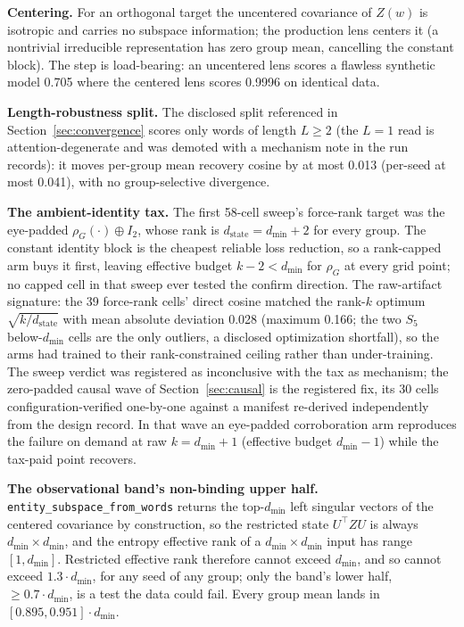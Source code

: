 \documentclass{article}
\newcommand{\dmin}{d_{\min}}
\newcommand{\dstate}{d_{\mathrm{state}}}
\begin{document}
\textbf{Centering.} For an orthogonal target the uncentered covariance
of $Z(w)$ is isotropic and carries no subspace information; the
production lens centers it (a nontrivial irreducible representation has
zero group mean, cancelling the constant block). The step is
load-bearing: an uncentered lens scores a flawless synthetic model 0.705
where the centered lens scores 0.9996 on identical data.

\textbf{Length-robustness split.} The disclosed split referenced in
Section~\ref{sec:convergence} scores only words of length $L \geq 2$
(the $L = 1$ read is attention-degenerate and was demoted with a
mechanism note in the run records): it moves per-group mean recovery
cosine by at most 0.013 (per-seed at most 0.041), with no
group-selective divergence.

\textbf{The ambient-identity tax.} The first 58-cell sweep's force-rank
target was the eye-padded $\rho_G(\cdot) \oplus I_2$, whose rank is
$\dstate = \dmin + 2$ for every group.
The constant identity block is
the cheapest reliable loss reduction, so a rank-capped arm buys it
first, leaving effective budget $k - 2 < \dmin$ for $\rho_G$ at every
grid point; no capped cell in that sweep ever tested the confirm
direction. The raw-artifact signature: the 39 force-rank cells' direct
cosine matched the rank-$k$ optimum $\sqrt{k/\dstate}$ with mean
absolute deviation 0.028 (maximum 0.166; the two $S_5$ below-$\dmin$
cells are the only outliers, a disclosed optimization shortfall), so the
arms had trained to their rank-constrained ceiling rather than
under-training.
The sweep verdict was registered as inconclusive with the tax as
mechanism; the zero-padded causal wave of Section~\ref{sec:causal} is
the registered fix, its 30 cells configuration-verified one-by-one
against a manifest re-derived independently from the design record. In
that wave an eye-padded corroboration arm reproduces the failure on
demand at raw $k = \dmin{+}1$ (effective budget $\dmin{-}1$) while the
tax-paid point recovers.

\textbf{The observational band's non-binding upper half.}
\texttt{entity\_subspace\_from\_words} returns the top-$\dmin$ left
singular vectors of the centered covariance by construction, so the
restricted state $U^{\top} Z U$ is always $\dmin \times \dmin$, and the
entropy effective rank of a $\dmin \times \dmin$ input has range
$[1, \dmin]$. Restricted effective rank therefore cannot exceed $\dmin$,
and so cannot exceed $1.3 \cdot \dmin$, for any seed of any group; only
the band's lower half, $\geq 0.7 \cdot \dmin$, is a test the data could
fail. Every group mean lands in $[0.895, 0.951] \cdot \dmin$.
\end{document}
